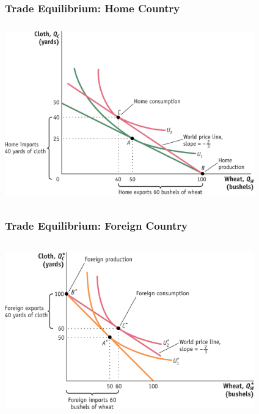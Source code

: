 \documentclass[handout]{beamer}
\begin{document}
\begin{frame}[t]
\frametitle{Trade Equilibrium: Home Country}
\vspace{.2cm}
\includegraphics[height=3in,width=4.25in]{Feenstra_Essentials2e_fig_02_05.jpg}
\end{frame}


\begin{frame}[t]
\frametitle{Trade Equilibrium: Foreign Country}
\vspace{.2cm}
\includegraphics[height=3in,width=4.25in]{Feenstra_Essentials2e_fig_02_06.jpg}
\end{frame}

\end{document}
